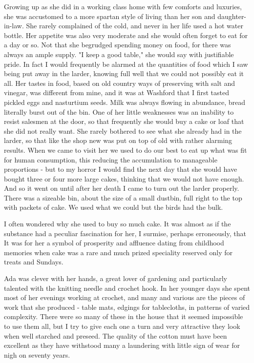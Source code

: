 Growing up as she did in a working class home with few comforts and luxuries, she was accustomed to a more spartan style of living than her son and daughter-in-law. She rarely complained of the cold, and never in her life used a hot water bottle. Her appetite was also very moderate and she would often forget to eat for a day or so. Not that she begrudged spending money on food, for there was always an ample supply. "I keep a good table," she would say with justifiable pride. In fact I would frequently be alarmed at the quantities of food which I saw being put away in the larder, knowing full well that we could not possibly eat it all. Her tastes in food, based on old country ways of preserving with salt and vinegar, was different from mine, and it was at Washford that I first tasted pickled eggs and nasturtium seeds. Milk was always flowing in abundance, bread literally burst out of the bin. One of her little weaknesses was an inability to resist salesmen at the door, so that frequently she would buy a cake or loaf that she did not really want. She rarely bothered to see what she already had in the larder, so that like the shop new was put on top of old with rather alarming results. When we came to visit her we used to do our best to eat up what was fit for human consumption, this reducing the accumulation to manageable proportions - but to my horror I would find the next day that she would have bought three or four more large cakes, thinking that we would not have enough. And so it went on until after her death I came to turn out the larder properly. There was a sizeable bin, about the size of a small dustbin, full right to the top with packets of cake. We used what we could but the birds had the bulk.

I often wondered why she used to buy so much cake. It was almost as if the substance had a peculiar fascination for her, I surmise, perhaps erroneously, that It was for her a symbol of prosperity and affluence dating from childhood memories when cake was a rare and much prized speciality reserved only for treats and Sundays.

Ada was clever with her hands, a great lover of gardening and particularly talented with the knitting needle and crochet hook. In her younger days she spent most of her evenings working at crochet, and many and various are the pieces of work that she produced - table mats, edgings for tablecloths, in patterns of varied complexity. There were so many of these in the house that it seemed impossible to use them all, but I try to give each one a turn and very attractive they look when well starched and preseed. The quality of the cotton must have been excellent as they have withstood many a laundering with little sign of wear for nigh on seventy years.

